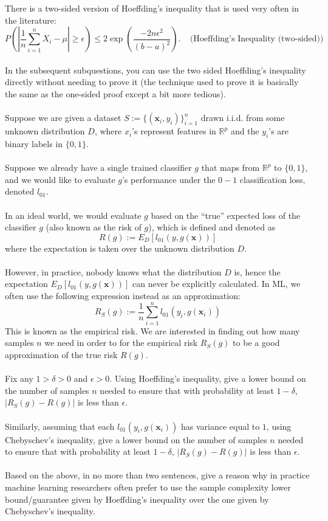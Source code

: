 \documentclass{exam}
\newcommand{\xv}{\boldsymbol{x}}
\begin{document}
There is a two-sided version of Hoeffding's inequality that is used very often in the literature: $$P\left(\left|\frac{1}{n} \sum_{i = 1}^n X_i - \mu\right| \geq \epsilon \right) \leq 2\exp\left(\frac{-2n\epsilon^2}{(b-a)^2}
\right).\;\;\;\; \textrm{(Hoeffding's Inequality (two-sided))}$$
\\In the subsequent subquestions, you can use the two sided Hoeffding's inequality directly without needing to prove it (the technique used to prove it is basically the same as the one-sided proof except a bit more tedious). 
\\\\
Suppose we are given a dataset $S := \{(\xv_i,y_i)\}_{i=1}^n$ drawn i.i.d. from some unknown distribution $D$, where $x_i$'s represent features in $\mathbb{R}^p$ and the $y_i$'s are binary labels in $\{0, 1\}$. 
\\\\
Suppose we already have a single trained classifier $g$ that maps from $\mathbb{R}^p$ to $\{0, 1\}$, and we would like to evaluate $g$'s performance under the $0-1$ classification loss, denoted $l_{01}$.
\\\\
In an ideal world, we would evaluate $g$ based on the ``true'' expected loss of the classifier $g$ (also known as the risk of $g$), which is defined and denoted as  $$ R(g) := E_{D}[l_{01}(y, g(\xv))]$$
where the expectation is taken over the unknown distribution $D$. 
\\\\
However, in practice, nobody knows what the distribution $D$ is, hence the expectation $E_{D}[l_{01}(y, g(\xv))]$ can never be explicitly calculated. In ML, we often use the following expression instead as an approximation: 
$$R_{S}(g):=\frac{1}{n}\sum_{i = 1}^n l_{01}(y_i, g(\xv_i))$$
This is known as the empirical risk. We are interested in finding out how many samples $n$ we need in order to for the empirical risk $R_{S}(g)$ to be a good approximation of the true risk $R(g)$. 
\\\\Fix any $1 > \delta > 0$ and $\epsilon > 0$. Using Hoeffding's inequality, give a lower bound on the number of samples $n$ needed to ensure that with probability at least $1 - \delta$, $|R_{S}(g) - R(g)|$ is less than $\epsilon$.
\\\\
Similarly, assuming that each $l_{01}(y_i, g(\xv_i))$ has variance equal to $1$, using Chebyschev's inequality, give a lower bound on the number of samples $n$ needed to ensure that with probability at least $1 - \delta$, $|R_{S}(g) - R(g)|$ is less than $\epsilon$. 
\\\\ Based on the above, in no more than two sentences, give a reason why in practice machine learning researchers often prefer to use the sample complexity lower bound/guarantee given by Hoeffding's inequality over the one given by Chebyschev's inequality. 
\end{document}
